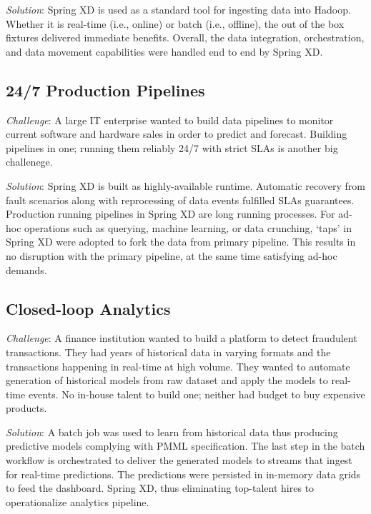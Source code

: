 \textit{Solution}: Spring XD is used as a standard tool for ingesting data 
into Hadoop. Whether it is real-time (i.e., online) or batch (i.e., offline),
the out of the box fixtures delivered immediate benefits. Overall, the data
integration, orchestration, and data movement capabilities were handled end
to end by Spring XD.

\subsection{24/7 Production Pipelines}
\textit{Challenge}: A large IT enterprise wanted to build data pipelines to
monitor current software and hardware sales in order to predict and forecast.
Building pipelines in one; running them reliably 24/7 with strict SLAs is
another big challenege.

\textit{Solution}: Spring XD is built as highly-available runtime. Automatic
recovery from fault scenarios along with reprocessing of data events fulfilled
SLAs guarantees. Production running pipelines in Spring XD are long running
processes. For ad-hoc operations such as querying, machine learning, or
data crunching, `taps' in Spring XD were adopted to fork the data from primary
pipeline. This results in no disruption with the primary pipeline, at the
same time satisfying ad-hoc demands.

\subsection{Closed-loop Analytics}
\textit{Challenge}: A finance institution wanted to build a platform to detect
fraudulent transactions. They had years of historical data in varying formats
and the transactions happening in real-time at high volume. They wanted to
automate generation of historical models from raw dataset and apply the models
to real-time events. No in-house talent to build one; neither had budget to buy
expensive products.

\textit{Solution}: A batch job was used to learn from historical data thus
producing predictive models complying with PMML specification. The last step
in the batch workflow is orchestrated to deliver the generated models to
streams that ingest for real-time predictions. The predictions were persisted
in in-memory data grids to feed the dashboard. Spring XD, thus eliminating
top-talent hires to operationalize analytics pipeline.
